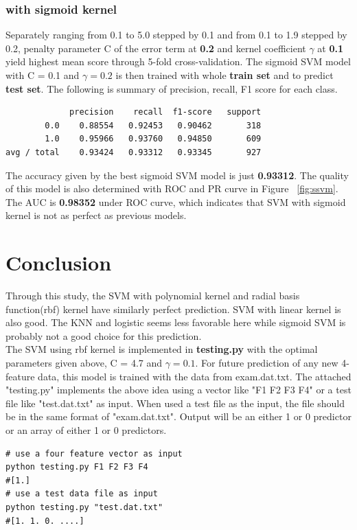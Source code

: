 \documentclass{article}
\begin{document}
\begin{singlespacing}
\subsubsection{with sigmoid kernel}
Separately ranging from 0.1 to 5.0 stepped by 0.1 and from 0.1 to 1.9 stepped by 0.2, penalty parameter C of the error term at \textbf{0.2} and kernel coefficient $\gamma$ at \textbf{0.1} yield highest mean score through 5-fold cross-validation. The sigmoid SVM model with C = 0.1 and $\gamma = 0.2 $ is then trained with  whole \textbf{train set} and to predict \textbf{test set}. The following is summary of precision, recall, F1 score for each class.
\begin{lstlisting}
             precision    recall  f1-score   support
        0.0    0.88554   0.92453   0.90462       318
        1.0    0.95966   0.93760   0.94850       609
avg / total    0.93424   0.93312   0.93345       927
\end{lstlisting}
The accuracy given by the best sigmoid SVM model is just \textbf{0.93312}. The quality of this model is also determined with ROC and PR curve in Figure ~\ref{fig:ssvm}. The AUC is \textbf{0.98352} under ROC curve, which indicates that SVM with sigmoid kernel is not as  perfect as previous models.

\section{Conclusion}
Through this study, the SVM with polynomial kernel and radial basis function(rbf) kernel have similarly perfect prediction. SVM with linear kernel is also good. The KNN and logistic seems less favorable here while sigmoid SVM is probably not a good choice for this prediction.\\

\noindent The SVM using rbf kernel is implemented in \textbf{testing.py} with the optimal parameters given above, C = 4.7 and $\gamma = 0.1$. For future prediction of any new 4-feature data, this model is trained with the data from exam.dat.txt. The attached "testing.py" implements the above idea using a vector like "F1 F2 F3 F4" or a test file like "test.dat.txt" as input. When used a test file as the input, the file should be in the same format of "exam.dat.txt". Output will be an either 1 or 0 predictor or an array of either 1 or 0 predictors.

\begin{lstlisting}
# use a four feature vector as input
python testing.py F1 F2 F3 F4
#[1.]
# use a test data file as input
python testing.py "test.dat.txt"
#[1. 1. 0. ....]
\end{lstlisting}


\end{singlespacing}
\end{document}
